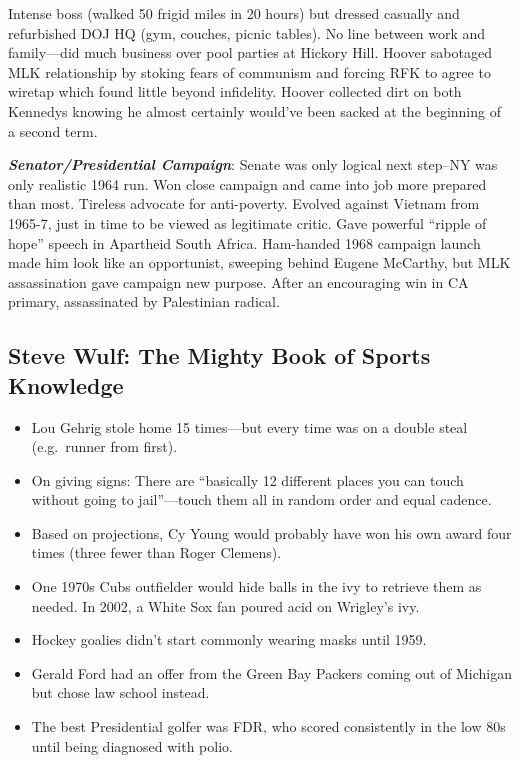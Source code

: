 \documentclass[
]{article}
\begin{document}
Intense boss (walked 50 frigid miles in 20 hours) but dressed casually
and refurbished DOJ HQ (gym, couches, picnic tables). No line between
work and family---did much business over pool parties at Hickory Hill.
Hoover sabotaged MLK relationship by stoking fears of communism and
forcing RFK to agree to wiretap which found little beyond infidelity.
Hoover collected dirt on both Kennedys knowing he almost certainly
would've been sacked at the beginning of a second term.

\textbf{\emph{Senator/Presidential Campaign}}: Senate was only logical
next step--NY was only realistic 1964 run. Won close campaign and came
into job more prepared than most. Tireless advocate for anti-poverty.
Evolved against Vietnam from 1965-7, just in time to be viewed as
legitimate critic. Gave powerful ``ripple of hope'' speech in Apartheid
South Africa. Ham-handed 1968 campaign launch made him look like an
opportunist, sweeping behind Eugene McCarthy, but MLK assassination gave
campaign new purpose. After an encouraging win in CA primary,
assassinated by Palestinian radical.

\hypertarget{steve-wulf-the-mighty-book-of-sports-knowledge}{%
\subsection{Steve Wulf: The Mighty Book of Sports
Knowledge}\label{steve-wulf-the-mighty-book-of-sports-knowledge}}

\begin{itemize}
\item
  Lou Gehrig stole home 15 times---but every time was on a double steal
  (e.g.~runner from first).
\item
  On giving signs: There are ``basically 12 different places you can
  touch without going to jail''---touch them all in random order and
  equal cadence.
\item
  Based on projections, Cy Young would probably have won his own award
  four times (three fewer than Roger Clemens).
\item
  One 1970s Cubs outfielder would hide balls in the ivy to retrieve them
  as needed. In 2002, a White Sox fan poured acid on Wrigley's ivy.
\item
  Hockey goalies didn't start commonly wearing masks until 1959.
\item
  Gerald Ford had an offer from the Green Bay Packers coming out of
  Michigan but chose law school instead.
\item
  The best Presidential golfer was FDR, who scored consistently in the
  low 80s until being diagnosed with polio.
\end{itemize}
\end{document}
